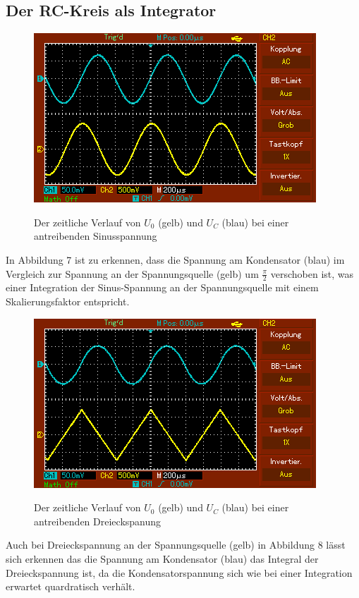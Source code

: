 	 \subsection{Der RC-Kreis als Integrator}
	 \begin{figure}[H]
	 	\centering
	 	\caption{Der zeitliche Verlauf von $U_0$ (gelb) und $U_C$ (blau) bei einer antreibenden Sinusspannung}
	 	\includegraphics[width=\linewidth-70pt,height=\textheight-70pt,keepaspectratio]{content/MAP002.png}
	 	\label{fig:Sinus}
	 \end{figure}
	 In Abbildung 7 ist zu erkennen, dass die Spannung am Kondensator (blau) im Vergleich zur Spannung an der Spannungsquelle (gelb) um $\frac{\pi}{2}$ verschoben ist, was einer Integration der Sinus-Spannung an der Spannungsquelle mit einem Skalierungsfaktor entspricht. 
	 
	 
	 \begin{figure}[H]
	 	\centering
	 	\caption{Der zeitliche Verlauf von $U_0$ (gelb) und $U_C$ (blau) bei einer antreibenden Dreieckspanung}
	 	\includegraphics[width=\linewidth-70pt,height=\textheight-70pt,keepaspectratio]{content/MAP003.png}
	 	\label{fig:Dreieck}
	 \end{figure}
	 Auch bei Dreieckspannung an der Spannungsquelle (gelb) in Abbildung 8 lässt sich erkennen das die Spannung am Kondensator (blau) das Integral der Dreieckspannung ist, da die Kondensatorspannung sich wie bei einer Integration erwartet quardratisch verhält.
	 

